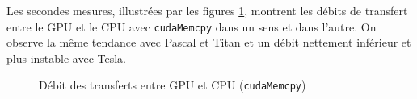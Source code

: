 Les secondes mesures, illustrées par les figures \ref{fig:cudamemcpy_throughput}, montrent les débits de transfert entre le \acs{GPU} et le \acs{CPU} avec \texttt{cudaMemcpy} dans un sens et dans l'autre. On observe la même tendance avec Pascal et Titan et un débit nettement inférieur et plus instable avec Tesla.

\begin{figure}[h]
	\centering
	\caption{Débit des transferts entre \acs{GPU} et \acs{CPU} (\texttt{cudaMemcpy})}
	\label{fig:cudamemcpy_throughput}
\end{figure}

